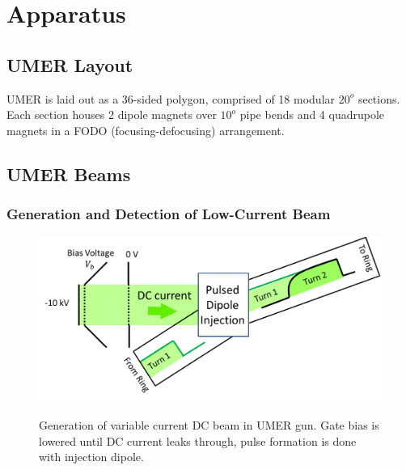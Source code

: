 
\renewcommand{\thechapter}{3}

\chapter{Apparatus}
\label{ch:apparatus}

\section{UMER Layout}

UMER is laid out as a 36-sided polygon, comprised of 18 modular $20^o$ sections. Each section houses 2 dipole magnets over $10^o$ pipe bends and 4 quadrupole magnets in a FODO (focusing-defocusing) arrangement.

\section{UMER Beams}


	\subsection{Generation and Detection of Low-Current Beam}
	

\begin{figure}
\begin{center}
\includegraphics[width=\textwidth]{3.figures/DCbeam.png}
\end{center}
\renewcommand{\baselinestretch}{1}
\small\normalsize
\begin{quote}
\caption[]{Generation of variable current DC beam in UMER gun. Gate bias is lowered until DC current leaks through, pulse formation is done with injection dipole.}
\label{fig:DCbeamcartoon}
\end{quote}
\end{figure} 
\renewcommand{\baselinestretch}{2}
\small\normalsize
	
